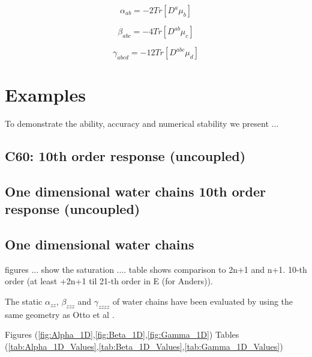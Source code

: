 \documentclass[twocolumn,showpacs,preprintnumbers,amsmath,amssymb]{revtex4}
\begin{document}
\begin{equation}
  \alpha_{ab}=-2Tr[D^a\mu_b]
\end{equation}

\begin{equation}
  \beta_{abc}=-4Tr[D^{ab}\mu_c]
\end{equation}

\begin{equation}
  \gamma_{abcd}=-12Tr[D^{abc}\mu_d]
\end{equation}



\section{Examples}
To demonstrate the ability, accuracy and numerical stability we present
...

\subsection{C60: 10th order response (uncoupled)}


\subsection{One dimensional water chains 10th order response (uncoupled)}

\subsection{One dimensional water chains}
figures ... show the saturation ....
table shows comparison to 2n+1 and n+1.
10-th order (at least +2n+1 til 21-th order in E (for Anders)).

The static $\alpha_{zz}$, $\beta_{zzz}$ and $\gamma_{zzzz}$ 
of water chains have been evaluated by using the same geometry as
Otto et al \cite{POtto00}.

Figures (\ref{fig:Alpha_1D},\ref{fig:Beta_1D},\ref{fig:Gamma_1D})
Tables (\ref{tab:Alpha_1D_Values},\ref{tab:Beta_1D_Values},\ref{tab:Gamma_1D_Values})
\end{document}
